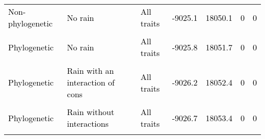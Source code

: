 \documentclass[
  12pt,
  letterpaper,
  DIV=11,
  numbers=noendperiod]{scrartcl}
\begin{document}
\begin{table}[H]
{\begin{tabular}[t]{lllllll}
\textcolor{black}{Non-phylogenetic} & \textcolor{black}{No rain} & \textcolor{black}{All traits} & \textcolor{black}{-9025.1} & \textcolor{black}{18050.1} & \textcolor{black}{0} & \textcolor{black}{0}\\
\cellcolor{gray!6}{\textcolor{black}{Non-phylogenetic}} & \cellcolor{gray!6}{\textcolor{black}{Rain with an interaction of cons and cona}} & \cellcolor{gray!6}{\textcolor{black}{All traits}} & \cellcolor{gray!6}{\textcolor{black}{-9025.7}} & \cellcolor{gray!6}{\textcolor{black}{18051.4}} & \cellcolor{gray!6}{\textcolor{black}{0}} & \cellcolor{gray!6}{\textcolor{black}{0}}\\
\addlinespace
\textcolor{black}{Phylogenetic} & \textcolor{black}{No rain} & \textcolor{black}{All traits} & \textcolor{black}{-9025.8} & \textcolor{black}{18051.7} & \textcolor{black}{0} & \textcolor{black}{0}\\
\cellcolor{gray!6}{\textcolor{black}{Non-phylogenetic}} & \cellcolor{gray!6}{\textcolor{black}{Rain without interactions}} & \cellcolor{gray!6}{\textcolor{black}{All traits}} & \cellcolor{gray!6}{\textcolor{black}{-9025.8}} & \cellcolor{gray!6}{\textcolor{black}{18051.7}} & \cellcolor{gray!6}{\textcolor{black}{0}} & \cellcolor{gray!6}{\textcolor{black}{0}}\\
\textcolor{black}{Phylogenetic} & \textcolor{black}{Rain with an interaction of cons} & \textcolor{black}{All traits} & \textcolor{black}{-9026.2} & \textcolor{black}{18052.4} & \textcolor{black}{0} & \textcolor{black}{0}\\
\cellcolor{gray!6}{\textcolor{black}{Non-phylogenetic}} & \cellcolor{gray!6}{\textcolor{black}{Rain with an interaction of cona}} & \cellcolor{gray!6}{\textcolor{black}{All traits}} & \cellcolor{gray!6}{\textcolor{black}{-9026.3}} & \cellcolor{gray!6}{\textcolor{black}{18052.7}} & \cellcolor{gray!6}{\textcolor{black}{0}} & \cellcolor{gray!6}{\textcolor{black}{0}}\\
\textcolor{black}{Phylogenetic} & \textcolor{black}{Rain without interactions} & \textcolor{black}{All traits} & \textcolor{black}{-9026.7} & \textcolor{black}{18053.4} & \textcolor{black}{0} & \textcolor{black}{0}\\
\addlinespace
\cellcolor{gray!6}{\textcolor{black}{Phylogenetic}} & \cellcolor{gray!6}{\textcolor{black}{Rain with an interaction of cons and cona}} & \cellcolor{gray!6}{\textcolor{black}{All traits}} & \cellcolor{gray!6}{\textcolor{black}{-9026.8}} & \cellcolor{gray!6}{\textcolor{black}{18053.6}} & \cellcolor{gray!6}{\textcolor{black}{0}} & \cellcolor{gray!6}{\textcolor{black}{0}}\\

\end{tabular}}
\end{table}
\end{document}
